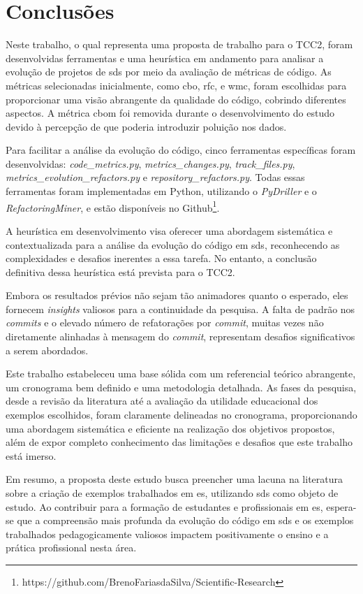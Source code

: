 \chapter{Conclusões}
\label{cap:conclusoes}

Neste trabalho, o qual representa uma proposta de trabalho para o TCC2, foram desenvolvidas ferramentas e uma heurística em andamento para analisar a evolução de projetos de \gls{sds} por meio da avaliação de métricas de código. As métricas selecionadas inicialmente, como \gls{cbo}, \gls{rfc}, e \gls{wmc}, foram escolhidas para proporcionar uma visão abrangente da qualidade do código, cobrindo diferentes aspectos. A métrica \gls{cbom} foi removida durante o desenvolvimento do estudo devido à percepção de que poderia introduzir poluição nos dados.

Para facilitar a análise da evolução do código, cinco ferramentas específicas foram desenvolvidas: \textit{code\_metrics.py}, \textit{metrics\_changes.py}, \textit{track\_files.py}, \textit{metrics\_evolution\_refactors.py} e \textit{repository\_refactors.py}. Todas essas ferramentas foram implementadas em Python, utilizando o \textit{PyDriller} e o \textit{RefactoringMiner}, e estão disponíveis no Github\footnote{https://github.com/BrenoFariasdaSilva/Scientific-Research}.

A heurística em desenvolvimento visa oferecer uma abordagem sistemática e contextualizada para a análise da evolução do código em \gls{sds}, reconhecendo as complexidades e desafios inerentes a essa tarefa. No entanto, a conclusão definitiva dessa heurística está prevista para o TCC2.

Embora os resultados prévios não sejam tão animadores quanto o esperado, eles fornecem \textit{insights} valiosos para a continuidade da pesquisa. A falta de padrão nos \textit{commits} e o elevado número de refatorações por \textit{commit}, muitas vezes não diretamente alinhadas à mensagem do \textit{commit}, representam desafios significativos a serem abordados.

Este trabalho estabeleceu uma base sólida com um referencial teórico abrangente, um cronograma bem definido e uma metodologia detalhada. As fases da pesquisa, desde a revisão da literatura até a avaliação da utilidade educacional dos exemplos escolhidos, foram claramente delineadas no cronograma, proporcionando uma abordagem sistemática e eficiente na realização dos objetivos propostos, além de expor completo conhecimento das limitações e desafios que este trabalho está imerso.

Em resumo, a proposta deste estudo busca preencher uma lacuna na literatura sobre a criação de exemplos trabalhados em \gls{es}, utilizando \gls{sds} como objeto de estudo. Ao contribuir para a formação de estudantes e profissionais em \gls{es}, espera-se que a compreensão mais profunda da evolução do código em \gls{sds} e os exemplos trabalhados pedagogicamente valiosos impactem positivamente o ensino e a prática profissional nesta área.